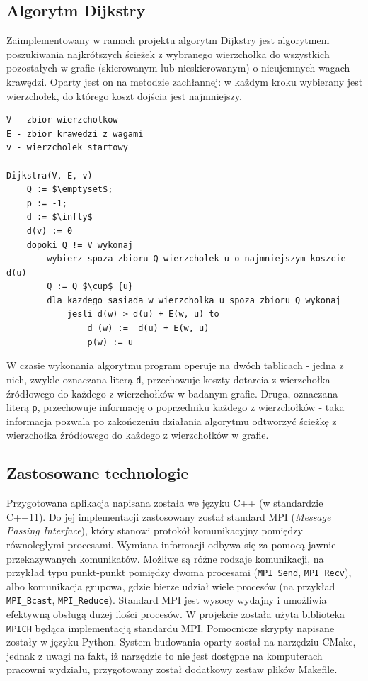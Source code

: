 \documentclass[12pt]{article}
\begin{document}
\subsection{Algorytm Dijkstry}
Zaimplementowany w ramach projektu algorytm Dijkstry jest algorytmem poszukiwania najkrótszych ścieżek z wybranego wierzchołka do wszystkich pozostałych w grafie (skierowanym lub nieskierowanym) o nieujemnych wagach krawędzi. Oparty jest on na metodzie zachłannej: w każdym kroku wybierany jest wierzchołek, do którego koszt dojścia jest najmniejszy. 

\begin{lstlisting}[caption={Pseudokod algorytmu Dijkstry.}, captionpos=b, mathescape=true, basicstyle=\scriptsize]
V - zbior wierzcholkow
E - zbior krawedzi z wagami
v - wierzcholek startowy

Dijkstra(V, E, v)
    Q := $\emptyset$;
    p := -1;
    d := $\infty$
    d(v) := 0
    dopoki Q != V wykonaj
        wybierz spoza zbioru Q wierzcholek u o najmniejszym koszcie d(u)
        Q := Q $\cup$ {u}
        dla kazdego sasiada w wierzcholka u spoza zbioru Q wykonaj
            jesli d(w) > d(u) + E(w, u) to
                d (w) :=  d(u) + E(w, u)
                p(w) := u
\end{lstlisting}

W czasie wykonania algorytmu program operuje na dwóch tablicach - jedna z nich, zwykle oznaczana literą \lstinline{d}, przechowuje koszty dotarcia z wierzchołka źródłowego do każdego z wierzchołków w badanym grafie. Druga, oznaczana literą \lstinline{p}, przechowuje informację o poprzedniku każdego z wierzchołków - taka informacja pozwala po zakończeniu działania algorytmu odtworzyć ścieżkę z wierzchołka źródłowego do każdego z wierzchołków w grafie.

\subsection{Zastosowane technologie}
Przygotowana aplikacja napisana została we języku C++ (w standardzie C++11). Do jej implementacji zastosowany został standard MPI (\textit{Message Passing Interface}), który stanowi protokół komunikacyjny pomiędzy równoległymi procesami. Wymiana informacji odbywa się za pomocą jawnie przekazywanych komunikatów. Możliwe są różne rodzaje komunikacji, na przykład typu punkt-punkt pomiędzy dwoma procesami (\lstinline|MPI_Send|, \lstinline|MPI_Recv|), albo komunikacja grupowa, gdzie bierze udział wiele procesów (na przykład \lstinline|MPI_Bcast|, \lstinline|MPI_Reduce|). Standard MPI jest wysocy wydajny i umożliwia efektywną obsługą dużej ilości procesów. W projekcie została użyta biblioteka \lstinline|MPICH| będąca implementacją standardu MPI. Pomocnicze skrypty napisane zostały w języku Python. System budowania oparty został na narzędziu CMake, jednak z uwagi na fakt, iż narzędzie to nie jest dostępne na komputerach pracowni wydziału, przygotowany został dodatkowy zestaw plików Makefile.
\end{document}
